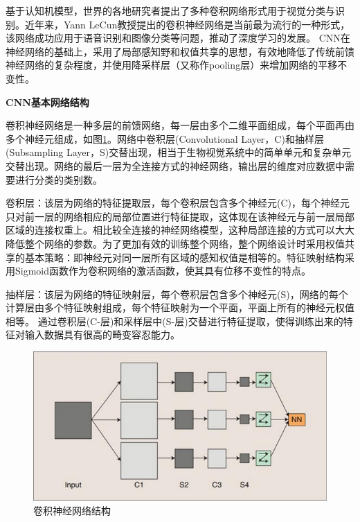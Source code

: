 基于认知机模型，世界的各地研究者提出了多种卷积网络形式用于视觉分类与识别。近年来，Yann LeCun教授提出的卷积神经网络是当前最为流行的一种形式，该网络成功应用于语音识别和图像分类等问题，推动了深度学习的发展。 CNN在神经网络的基础上，采用了局部感知野和权值共享的思想，有效地降低了传统前馈神经网络的复杂程度，并使用降采样层（又称作pooling层）来增加网络的平移不变性。

\textbf{CNN基本网络结构} 

卷积神经网络是一种多层的前馈网络，每一层由多个二维平面组成，每个平面再由多个神经元组成，如图\ref{cnn}。网络中卷积层(Convolutional Layer，C)和抽样层(Subsampling Layer，S)交替出现，相当于生物视觉系统中的简单单元和复杂单元交替出现。网络的最后一层为全连接方式的神经网络，输出层的维度对应数据中需要进行分类的类别数。

卷积层：该层为网络的特征提取层，每个卷积层包含多个神经元(C)，每个神经元只对前一层的网络相应的局部位置进行特征提取，这体现在该神经元与前一层局部区域的连接权重上。相比较全连接的神经网络模型，这种局部连接的方式可以大大降低整个网络的参数。为了更加有效的训练整个网络，整个网络设计时采用权值共享的基本策略：即神经元对同一层所有区域的感知权值是相等的。特征映射结构采用Sigmoid函数作为卷积网络的激活函数，使其具有位移不变性的特点。

抽样层：该层为网络的特征映射层，每个卷积层包含多个神经元(S)，网络的每个计算层由多个特征映射组成，每个特征映射为一个平面，平面上所有的神经元权值相等。
通过卷积层(C-层)和采样层中(S-层)交替进行特征提取，使得训练出来的特征对输入数据具有很高的畸变容忍能力。

\begin{figure}[htbp]
\begin{center}
 \includegraphics[width=0.98\linewidth]{figures/cnn}
 \end{center} \vspace{-4mm}
\caption{卷积神经网络结构} 
\label{cnn}
\end{figure}



